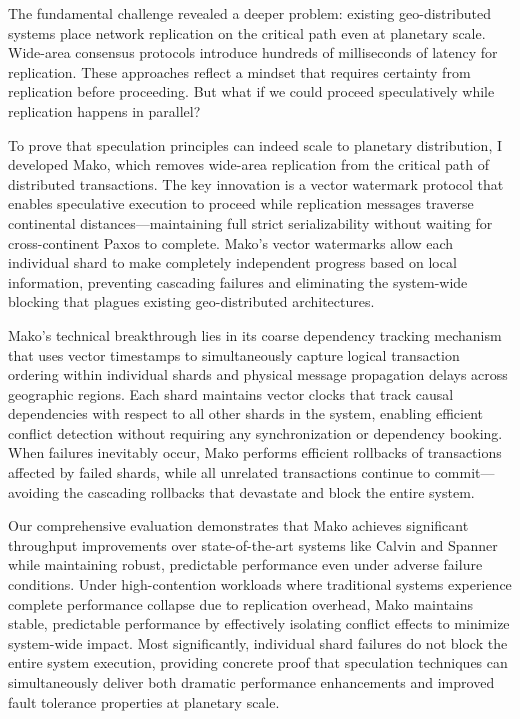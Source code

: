 \documentclass[11pt,letterpaper]{article}
\begin{document}
The fundamental challenge revealed a deeper problem: existing geo-distributed systems place network replication on the critical path even at planetary scale. Wide-area consensus protocols introduce hundreds of milliseconds of latency for replication. These approaches reflect a mindset that requires certainty from replication before proceeding. But what if we could proceed speculatively while replication happens in parallel?

To prove that speculation principles can indeed scale to planetary distribution, I developed Mako, which removes wide-area replication from the critical path of distributed transactions. The key innovation is a vector watermark protocol that enables speculative execution to proceed while replication messages traverse continental distances—maintaining full strict serializability without waiting for cross-continent Paxos to complete. 
Mako's vector watermarks allow each individual shard to make completely independent progress based on local information, preventing cascading failures and eliminating the system-wide blocking that plagues existing geo-distributed architectures.

Mako's technical breakthrough lies in its coarse dependency tracking mechanism that uses vector timestamps to simultaneously capture logical transaction ordering within individual shards and physical message propagation delays across geographic regions. 
Each shard maintains vector clocks that track causal dependencies with respect to all other shards in the system, enabling efficient conflict detection without requiring any synchronization or dependency booking. 
When failures inevitably occur, Mako performs efficient rollbacks of transactions affected by failed shards, while all unrelated transactions continue to commit—avoiding the cascading rollbacks that devastate and block the entire system.


Our comprehensive evaluation demonstrates that Mako achieves significant throughput improvements over state-of-the-art systems like Calvin and Spanner while maintaining robust, predictable performance even under adverse failure conditions. 
Under high-contention workloads where traditional systems experience complete performance collapse due to replication overhead, Mako maintains stable, predictable performance by effectively isolating conflict effects to minimize system-wide impact. 
Most significantly, individual shard failures do not block the entire system execution, providing concrete proof that speculation techniques can simultaneously deliver both dramatic performance enhancements and improved fault tolerance properties at planetary scale.
\end{document}
